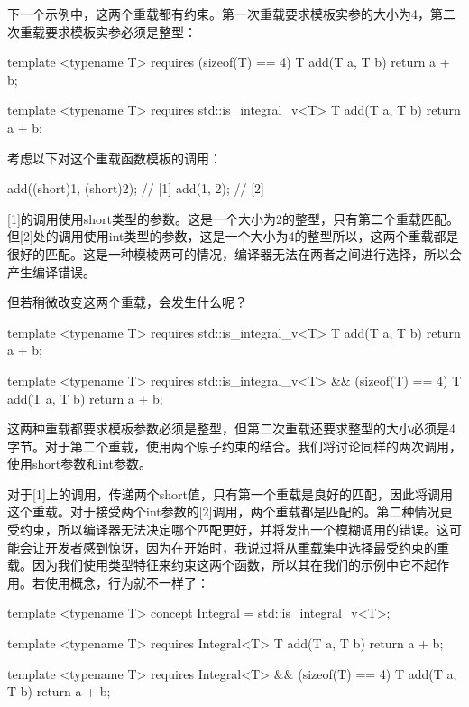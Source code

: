 下一个示例中，这两个重载都有约束。第一次重载要求模板实参的大小为4，第二次重载要求模板实参必须是整型：

\begin{cppcode}
template <typename T>
requires (sizeof(T) == 4)
T add(T a, T b)
{
	return a + b;
}

template <typename T>
requires std::is_integral_v<T>
T add(T a, T b)
{
	return a + b;
}
\end{cppcode}

考虑以下对这个重载函数模板的调用：

\begin{cppcode}
add((short)1, (short)2); // [1]
add(1, 2); // [2]
\end{cppcode}

[1]的调用使用short类型的参数。这是一个大小为2的整型，只有第二个重载匹配。但[2]处的调用使用int类型的参数，这是一个大小为4的整型所以，这两个重载都是很好的匹配。这是一种模棱两可的情况，编译器无法在两者之间进行选择，所以会产生编译错误。

但若稍微改变这两个重载，会发生什么呢？

\begin{cppcode}
template <typename T>
requires std::is_integral_v<T>
T add(T a, T b)
{
	return a + b;
}

template <typename T>
requires std::is_integral_v<T> && (sizeof(T) == 4)
T add(T a, T b)
{
	return a + b;
}
\end{cppcode}

这两种重载都要求模板参数必须是整型，但第二次重载还要求整型的大小必须是4字节。对于第二个重载，使用两个原子约束的结合。我们将讨论同样的两次调用，使用short参数和int参数。

对于[1]上的调用，传递两个short值，只有第一个重载是良好的匹配，因此将调用这个重载。对于接受两个int参数的[2]调用，两个重载都是匹配的。第二种情况更受约束，所以编译器无法决定哪个匹配更好，并将发出一个模糊调用的错误。这可能会让开发者感到惊讶，因为在开始时，我说过将从重载集中选择最受约束的重载。因为我们使用类型特征来约束这两个函数，所以其在我们的示例中它不起作用。若使用概念，行为就不一样了：

\begin{cppcode}
template <typename T>
concept Integral = std::is_integral_v<T>;

template <typename T>
requires Integral<T>
T add(T a, T b)
{
	return a + b;
}

template <typename T>
requires Integral<T> && (sizeof(T) == 4)
T add(T a, T b)
{
	return a + b;
}
\end{cppcode}

